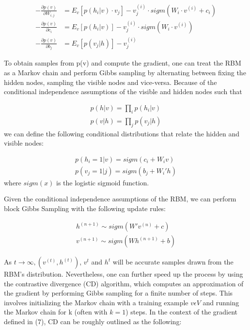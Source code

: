 \documentclass[journal]{IEEEtran}
\begin{document}
\begin{equation}
\begin{aligned}
- \frac{\partial p(v)}{\partial W_{i,j}} &= E_{v}[p(h_{i}|v)\cdot v_{j}] - v_{j}^{(i)}\cdot sigm(W_{i} \cdot v^{(i)} + c_{i})\\
- \frac{\partial p(v)}{\partial c_{i}} &= E_{v}[p(h_{i}|v)] - v_{j}^{(i)}\cdot sigm(W_{i} \cdot v^{(i)})\\
- \frac{\partial p(v)}{\partial b_{j}} &= E_{v}[p(v_{j}|h)] - v_{j}^{(i)}
\end{aligned}
\end{equation}

To obtain samples from p(v) and compute the gradient, one can treat the RBM as a Markov chain and perform Gibbs sampling by alternating between fixing the hidden nodes, sampling the visible nodes and vice-versa. Because of the conditional independence assumptions of the visible and hidden nodes such that 

\begin{equation}
\begin{aligned}
p(h|v) = \prod\limits_{i} p(h_{i}|v)\\
p(v|h) = \prod\limits_{j} p(v_{j}|h)
\end{aligned}
\end{equation} we can define the following conditional distributions that relate the hidden and visible nodes:

\begin{equation}
\begin{aligned}
p(h_{i} = 1|v) = sigm(c_{i} + W_{i}v)\\
p(v_{j} = 1|j) = sigm(b_{j} + W_{i}'h)
\end{aligned}
\end{equation} where $sigm(x)$ is the logistic sigmoid function.

Given the conditional independence assumptions of the RBM, we can perform block Gibbs Sampling with the following update rules:

\begin{equation}
\begin{aligned}
h^{(n+1)} \sim sigm(W'v^{(n)} + c)\\
v^{(n+1)} \sim sigm(Wh^{(n+1)} + b)
\end{aligned}
\end{equation}

As $t \rightarrow \infty,  (v^{(t)},h^{(t)})$, $v^{t}$ and $h^{t}$ will be accurate samples drawn from the RBM's distribution. Nevertheless, one can further speed up the process by using the contrastive divergence (CD) algorithm, which computes an approximation of the gradient by performing Gibbs sampling for a finite number of steps. This involves initializing the Markov chain with a training example $v \epsilon V$ and running the Markov chain for k (often with $k = 1$) steps. In the context of the gradient defined in (7), CD can be roughly outlined as the following:
\end{document}

